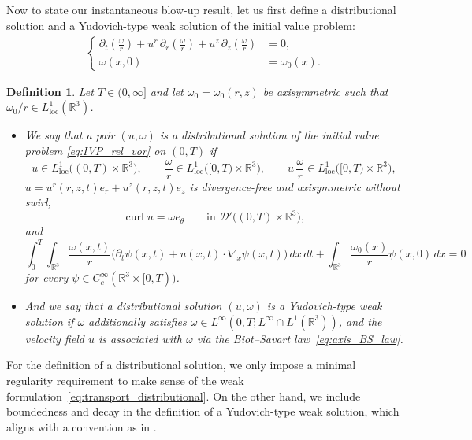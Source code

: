 \documentclass[reqno,11pt]{amsart}
\newtheorem{definition}{Definition}[section]
\begin{document}
Now to state our instantaneous blow-up result, let us first define a distributional solution and a Yudovich-type weak solution of the initial value problem:
    \begin{align}
    \label{eq:IVP_rel_vor}
    \left\{
    \begin{aligned}
        \partial_t \left(\frac{\omega}{r}\right)
        + u^r \, \partial_r  \left(\frac{\omega}{r}\right)
        +u^z \, \partial_z  \left(\frac{\omega}{r}\right)&=0, 
        \\
        \omega(x,0)&=\omega_0(x).
    \end{aligned}
    \right.
    \end{align}
\begin{definition}
\label{def:dist_sol_rel_vor}
Let \(T\in (0,\infty]\) and let \(\omega_0=\omega_0(r,z)\) be axisymmetric such that $\omega_0/r\in L^1_{\mathrm{loc}} (\mathbb{R}^3)$. 
\begin{itemize}
    \item 
We say that a pair
\((u,\omega)\) is a \emph{distributional solution} of the initial value problem 
\eqref{eq:IVP_rel_vor} on \((0,T)\)  if
\[
u\in L^1_{\mathrm{loc}}\bigl((0,T)\times\mathbb{R}^3\bigr),
\qquad
\frac{\omega}{r}\in L^1_{\mathrm{loc}}\bigl([0,T)\times\mathbb{R}^3\bigr),
\qquad 
u\,\frac{\omega}{r}\in L^1_{\mathrm{loc}}\bigl([0,T)\times\mathbb{R}^3\bigr),
\]
\(u=u^r(r,z,t)e_r+u^z(r,z,t)e_z\) is divergence-free and axisymmetric without swirl,
\[
\operatorname{curl}u=\omega e_\theta
\qquad\text{in }\mathcal{D}'\bigl((0,T)\times\mathbb{R}^3\bigr),
\]
and
\begin{equation}
\int_0^T\int_{\mathbb{R}^3}\frac{\omega(x,t)}{r}
\bigl(\partial_t\psi(x,t)+u(x,t)\cdot\nabla_x\psi(x,t)\bigr)\,dx\,dt
+\int_{\mathbb{R}^3}\frac{\omega_0(x)}{r}\psi(x,0)\,dx
=0
\label{eq:transport_distributional}
\end{equation}
for every \(\psi\in C_c^\infty(\mathbb{R}^3\times[0,T))\).
\item And we say that a distributional solution $(u,\omega)$ is a \emph{Yudovich-type weak solution} if $\omega$ additionally satisfies $\omega\in L^\infty (0,T;L^\infty \cap L^1(\mathbb{R}^3))$, and the velocity field $u$ is associated with $\omega$ via the Biot--Savart law~\eqref{eq:axis_BS_law}.
\end{itemize}

\end{definition}



For the definition of a distributional solution, we only impose a minimal regularity requirement to make sense of the weak formulation~\eqref{eq:transport_distributional}. 
On the other hand, we include boundedness and decay in the definition of a Yudovich-type weak solution, which aligns with a convention as in \cite[Definition 8.1]{MajdaBertozzi01}. 
\end{document}
